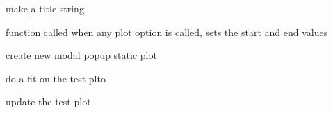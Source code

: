 \documentclass[letterpaper,10pt,english]{sphinxmanual}
\begin{document}
\begin{fulllineitems}
\begin{fulllineitems}
\label{VisualPlotter:Visualplotterwidget.VisualPlotter.make_updating_title_string}
make a title string

\end{fulllineitems}


\begin{fulllineitems}
\label{VisualPlotter:Visualplotterwidget.VisualPlotter.message}
\end{fulllineitems}


\begin{fulllineitems}
\label{VisualPlotter:Visualplotterwidget.VisualPlotter.plot_clicked}
function called when any plot option is called, sets the start and
end values

\end{fulllineitems}


\begin{fulllineitems}
\label{VisualPlotter:Visualplotterwidget.VisualPlotter.static_plot}
create new modal popup static plot

\end{fulllineitems}


\begin{fulllineitems}
\label{VisualPlotter:Visualplotterwidget.VisualPlotter.test_fit}
do a fit on the test plto

\end{fulllineitems}


\begin{fulllineitems}
\label{VisualPlotter:Visualplotterwidget.VisualPlotter.test_plot}
update the test plot

\end{fulllineitems}


\end{fulllineitems}
\end{document}
